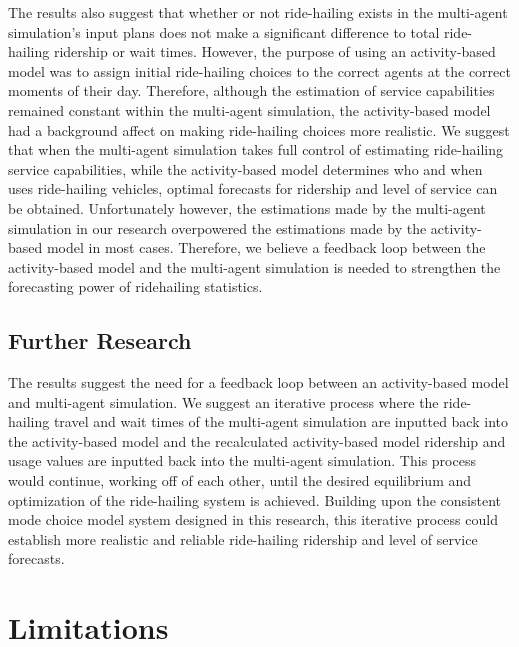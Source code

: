 \documentclass[fancy, masters]{byuthesis}
\begin{document}
The results also suggest that whether or not ride-hailing exists in the multi-agent simulation's input plans does not make a significant difference to total ride-hailing ridership or wait times. However, the purpose of using an activity-based model was to assign initial ride-hailing choices to the correct agents at the correct moments of their day. Therefore, although the estimation of service capabilities remained constant within the multi-agent simulation, the activity-based model had a background affect on making ride-hailing choices more realistic. We suggest that when the multi-agent simulation takes full control of estimating ride-hailing service capabilities, while the activity-based model determines who and when uses ride-hailing vehicles, optimal forecasts for ridership and level of service can be obtained. Unfortunately however, the estimations made by the multi-agent simulation in our research overpowered the estimations made by the activity-based model in most cases. Therefore, we believe a feedback loop between the activity-based model and the multi-agent simulation is needed to strengthen the forecasting power of ridehailing statistics.

\hypertarget{further-research}{%
\section{Further Research}\label{further-research}}

The results suggest the need for a feedback loop between an activity-based model and multi-agent simulation. We suggest an iterative process where the ride-hailing travel and wait times of the multi-agent simulation are inputted back into the activity-based model and the recalculated activity-based model ridership and usage values are inputted back into the multi-agent simulation. This process would continue, working off of each other, until the desired equilibrium and optimization of the ride-hailing system is achieved. Building upon the consistent mode choice model system designed in this research, this iterative process could establish more realistic and reliable ride-hailing ridership and level of service forecasts.

\hypertarget{limitations}{%
\chapter{Limitations}\label{limitations}}
\end{document}
